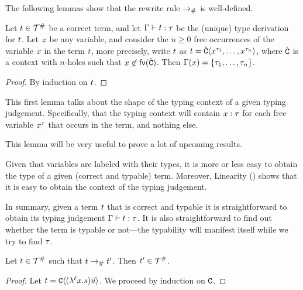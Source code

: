 The following lemmas show that the rewrite rule $\mathrel{\to_{\mathtt{\#}}}$ is well-defined.

\begin{lemma}[Linearity]
Let $t \in \mathcal{T}^{\mathtt{\#}}$ be a correct term,
and let $\Gamma \vdash t : \tau$ be the (unique) type derivation for $t$.
Let $x$ be any variable,
and consider the $n \geq 0$ free occurrences of the variable $x$ in the term $t$,
more precisely, write $t$ as $t = \hat{\mathtt{C}}\langle x^{\tau_1},\hdots,x^{\tau_n}\rangle$,
where $\hat{\mathtt{C}}$ is a context with $n$-holes such that $x \not\in \mathsf{fv}({\hat{\mathtt{C}}})$.
Then $\Gamma(x) = \{\tau_1,\hdots,\tau_n\}$.
\end{lemma}
\begin{proof}
By induction on $t$.
\end{proof}

This first lemma talks about the shape of the typing context of a given typing judgement.
Specifically, that the typing context will contain $x : \tau$ for each free variable
$x^\tau$ that occurs in the term, and nothing else.

This lemma will be very useful to prove a lot of upcoming results.

\begin{remark}
  Given that variables are labeled with their types, it is more or less easy to obtain
  the type of a given (correct and typable) term.
  Moreover, Linearity () shows that it is easy to obtain the context of the typing judgement.

  In summary, given a term $t$ that is correct and typable
  it is straightforward to obtain its typing judgement
  $\Gamma \vdash t : \tau$.
  It is also straightforward to find out whether the term is typable or not---the
  typability will manifest itself while we try to find $\tau$.
\end{remark}




\begin{lemma}
Let $t \in \mathcal{T}^{\mathtt{\#}}$ such that $t \mathrel{\to_{\mathtt{\#}}} t'$. Then $t' \in \mathcal{T}^{\mathtt{\#}}$.
\end{lemma}
\begin{proof}
Let $t = \mathtt{C}\langle(\lambda^{\ell} x. s) \vec{u}\rangle$. We proceed by induction on $\mathtt{C}$.
\end{proof}


